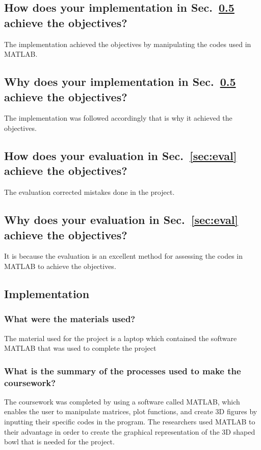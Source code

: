 \subsection{How does your implementation in Sec.~\ref{sec:implem} achieve the objectives?}
The implementation achieved the objectives by manipulating the codes used in MATLAB.
	
\subsection{Why does your implementation in Sec.~\ref{sec:implem} achieve the objectives?}
The implementation was followed accordingly that is why it achieved the objectives.
	
\subsection{How does your evaluation in Sec.~\ref{sec:eval} achieve the objectives?}
The evaluation corrected mistakes done in the project.
	
\subsection{Why does your evaluation in Sec.~\ref{sec:eval}  achieve the objectives?}
It is because the evaluation is an excellent method for assessing the codes in MATLAB  to achieve the objectives.




\subsection{Implementation}
\label{sec:implem}




\subsubsection{What were the materials used?}
The material used for the project is a laptop which contained the software MATLAB that was used to complete the project



\subsubsection{What is the summary of the processes used to make the coursework?}
The coursework was completed by using a software called MATLAB, which enables the user to manipulate matrices, plot functions, and create 3D figures by inputting their specific codes in the program. 
The researchers used MATLAB to their advantage in order to create the graphical representation of the 3D shaped bowl that is needed for the project.


